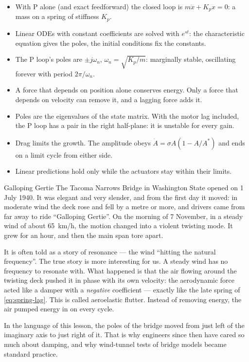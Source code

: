 \begin{remember}
\begin{itemize}
  \item With P alone (and exact feedforward) the closed loop is $m\ddot x + K_p x = 0$: a mass on a spring of stiffness $K_p$.
  \item Linear ODEs with constant coefficients are solved with $e^{st}$: the characteristic equation gives the poles, the initial conditions fix the constants.
  \item The P loop's poles are $\pm j\omega_n$, $\omega_n = \sqrt{K_p/m}$: marginally stable, oscillating forever with period $2\pi/\omega_n$.
  \item A force that depends on position alone conserves energy. Only a force that depends on velocity can remove it, and a lagging force adds it.
  \item Poles are the eigenvalues of the state matrix. With the motor lag included, the P loop has a pair in the right half-plane: it is unstable for every gain.
  \item Drag limits the growth. The amplitude obeys $\dot A = \sigma A(1 - A/A^*)$ and ends on a limit cycle from either side.
  \item Linear predictions hold only while the actuators stay within their limits.
\end{itemize}
\end{remember}

\begin{curiosity}{Galloping Gertie}
The Tacoma Narrows Bridge in Washington State opened on 1 July 1940. It was elegant and very slender, and from the first day it moved: in moderate wind the deck rose and fell by a metre or more, and drivers came from far away to ride \enquote{Galloping Gertie}. On the morning of 7 November, in a steady wind of about \SI{65}{km/h}, the motion changed into a violent twisting mode. It grew for an hour, and then the main span tore apart.

It is often told as a story of resonance — the wind \enquote{hitting the natural frequency}. The true story is more interesting for us. A steady wind has no frequency to resonate with. What happened is that the air flowing around the twisting deck pushed it in phase with its own velocity: the aerodynamic force acted like a damper with a \emph{negative} coefficient — exactly like the late spring of \cref{eq:spring-lag}. This is called aeroelastic flutter. Instead of removing energy, the air pumped energy in on every cycle.

In the language of this lesson, the poles of the bridge moved from just left of the imaginary axis to just right of it. That is why engineers since then have cared so much about damping, and why wind-tunnel tests of bridge models became standard practice.
\end{curiosity}

